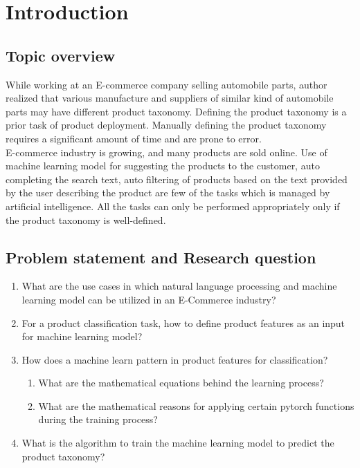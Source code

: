 \chapter{Introduction}

\section{Topic overview}

While working at an E-commerce company selling automobile parts, author realized that various manufacture and suppliers of similar kind of automobile parts may have different product taxonomy. Defining the product taxonomy is a prior task of product deployment. Manually defining the product taxonomy requires a significant amount of time and are prone to error. \\

E-commerce industry is growing, and many products are sold online. Use of machine learning model for suggesting the products to the customer, auto completing the search text, auto filtering of products based on the text provided by the user describing the product are few of the tasks which is managed by artificial intelligence. All the tasks can only be performed appropriately only if the product taxonomy is well-defined. \\

 

\section{Problem statement and Research question}

\begin{enumerate}[label=\textbf{RQ\arabic*:}]
    \item What are the use cases in which natural language processing and machine learning model can be utilized in an E-Commerce industry?
    \item For a product classification task, how to define product features as an input for machine learning model?
    \item How does a machine learn pattern in product features for classification?
    \begin{enumerate}[label=\textbf{SRQ\arabic*:}]
        \item What are the mathematical equations behind the learning process?
        \item What are the mathematical reasons for applying certain pytorch functions during the training process? 
    \end{enumerate}

    \item What is the algorithm to train the machine learning model to predict the product taxonomy?
\end{enumerate}

